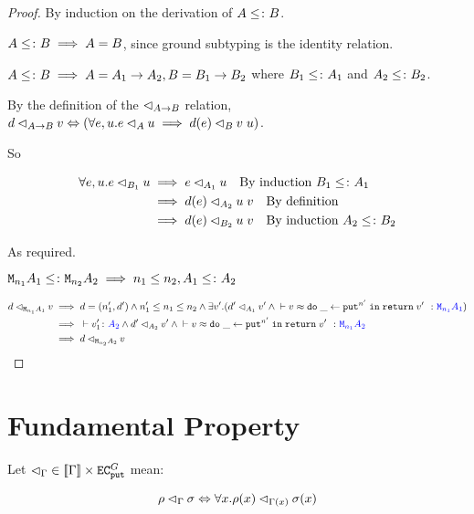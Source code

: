 \documentclass{Report}
\begin{document}
\begin{proof}
    By induction on the derivation of $A\leq\colon B$.

        $A\leq\colon B\implies A = B$, since ground subtyping is the identity relation.

        $A\leq\colon B\implies A = A_1\rightarrow A_2, B = B_1\rightarrow B_2$ where $B_1\leq\colon A_1$ and $A_2\leq\colon B_2$.

        By the definition of the $\lhd_{A\rightarrow B}$ relation, $\logRel{d}{\ab}{v} \Leftrightarrow (\forall e, u. \logRel{e}{A}{u}\implies \logRel{d(e)}{B}{\apply{v}{u}})$.

        So 

        \begin{align}
            \forall e, u. e \lhd_{B_1} u & \implies e \lhd_{A_1} u \quad\text{By induction $B_1\leq\colon A_1$}\\
            & \implies d(e) \lhd_{A_2} u\; v\quad\text{By definition}\\
            & \implies d(e) \lhd_{B_2} u\; v\quad\text{By induction $A_2\leq\colon B_2$}
        \end{align}

        As required.

    $\texttt{M}_{n_1}{A_1} \leq\colon \texttt{M}_{n_2}{A_2} \implies n_1\leq n_2, A_1\leq\colon A_2$

    \begin{align}
        \logRel{d}{\M{n_1}{A_1}}{v} & \implies  d=(n_1', d') \wedge n_1' \leq n_1\leq n_2 \wedge \exists v'. (\logRel{d'}{A_1}{v'} \wedge\zberelation{v}{\doin{\_}{\put^{n'}}{\return{v'}}}{\M{n_1}{A_1}})\\
        & \implies \ztyperelation{v_1'}{A_2} \wedge \logRel{d'}{A_2}{v'} \wedge \zberelation{v}{\doin{\_}{\put^{n'}}{\return{v'}}}{\M{n_1}{A_2}}\\
        & \implies \logRel{d}{\M{n_2}{A_2}}{v}
    \end{align}
\end{proof}

\section{Fundamental Property}\label{FundProp}
Let $\lhd_\Gamma \in {\bf [\![}\Gamma{\bf ]\!]}\times \texttt{EC}_{\texttt{put}}^G$ mean:

\begin{equation}
    \label{LogicalRelationTypeEnvironment}
    \rho \lhd_{\Gamma} \sigma \Leftrightarrow \forall x. \rho(x) \lhd_{\Gamma(x)} \sigma(x)
\end{equation}
\end{document}
